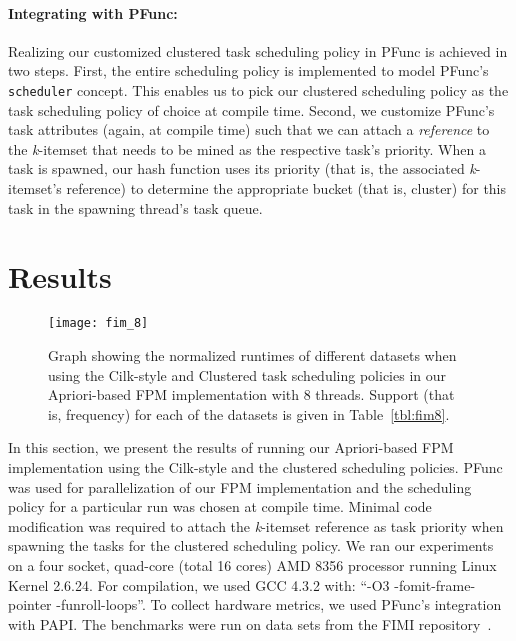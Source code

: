 \documentclass{IOS-Book-Article}
\newcommand{\code}[1]{\lstinline[basicstyle=\sffamily]{#1}}
\begin{document}
\paragraph{Integrating with PFunc:} Realizing our customized clustered task
scheduling policy in PFunc is achieved in two steps. 
First, the entire scheduling policy is implemented to model PFunc's 
\code{scheduler} concept. This enables us to pick our clustered scheduling
policy as the task scheduling policy of choice at compile time. 
Second, we customize PFunc's task attributes (again, at compile time) such that
we can attach a \textit{reference} to the \textit{k}-itemset that needs to be
mined as the respective task's priority. When a task is spawned, our hash
function uses its priority (that is, the associated \textit{k}-itemset's
reference) to determine the appropriate bucket (that is, cluster) for this task
in the spawning thread's task queue.

\section{Results}
\label{sec:results}

\begin{figure}[t]
\texttt{[image: fim\_8]}
\caption{Graph showing the normalized runtimes of different datasets when using
the Cilk-style and Clustered task scheduling policies in our Apriori-based
FPM implementation with 8 threads. Support (that is, frequency) for each of
the datasets is given in Table~\ref{tbl:fim8}.}
\label{fig:fim8}
\end{figure}

In this section, we present the results of running our Apriori-based FPM
implementation using the Cilk-style and the clustered scheduling policies.
PFunc was used for parallelization of our FPM implementation and the scheduling
policy for a particular run was chosen at compile time. Minimal code
modification was required to attach the \textit{k}-itemset reference as task
priority when spawning the tasks for the clustered scheduling policy.
We ran our experiments on a four socket, quad-core (total 16 cores) AMD 8356
processor running Linux Kernel 2.6.24.  For compilation, we used GCC 4.3.2
with: ``-O3 -fomit-frame-pointer -funroll-loops''. To collect hardware
metrics, we used PFunc's integration with PAPI.  The benchmarks were run on
data sets from the FIMI repository~\cite{bart:2004}.
\end{document}
